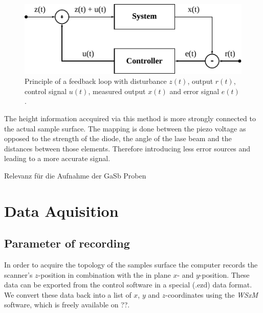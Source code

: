 \documentclass[paper=a4,fontsize=10pt,DIV=18,twocolumn,parskip=half]{scrartcl}
\numberwithin{equation}{section}    %
\begin{document}
\begin{figure}
    \centering
    \includegraphics{Bilder/control_loop.pdf}
    \caption{Principle of a feedback loop with disturbance $z(t)$, output 
        $r(t)$, control signal $u(t)$, measured output $x(t)$ and error signal 
        $e(t)$.}
    \label{control_loop}
\end{figure}

The height information accquired via this method is more strongly connected to 
the actual sample surface. The mapping is done between the piezo voltage as 
opposed to the strength of the diode, the angle of the lase beam and the 
distances between those elements. Therefore introducing less error sources and 
leading to a more accurate signal.

%
Relevanz für die Aufnahme der GaSb Proben\\
%

\section{Data Aquisition}
\label{dataaquisition}
\subsection{Parameter of recording}
In order to acquire the topology of the samples surface the computer records the 
scanner's $z$-position in combination with the in plane $x$- and $y$-position. 
These data can be exported from the control software in a special (.ezd) data 
format. We convert these data back into a list of $x$, $y$ and $z$-coordinates 
using the \textit{WSxM} software, which is freely available on ??. 
\end{document}
